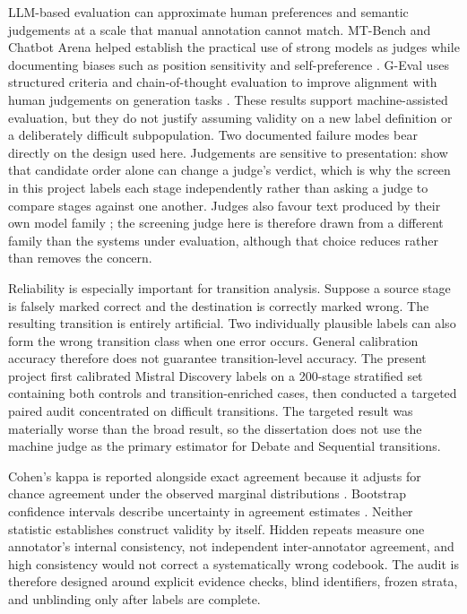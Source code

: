 LLM-based evaluation can approximate human preferences and semantic judgements at a scale that manual annotation cannot match. MT-Bench and Chatbot Arena helped establish the practical use of strong models as judges while documenting biases such as position sensitivity and self-preference \citep{zheng2023judge}. G-Eval uses structured criteria and chain-of-thought evaluation to improve alignment with human judgements on generation tasks \citep{liu2023geval}. These results support machine-assisted evaluation, but they do not justify assuming validity on a new label definition or a deliberately difficult subpopulation. Two documented failure modes bear directly on the design used here. Judgements are sensitive to presentation: \citet{wang2024fair} show that candidate order alone can change a judge's verdict, which is why the screen in this project labels each stage independently rather than asking a judge to compare stages against one another. Judges also favour text produced by their own model family \citep{panickssery2024selfpref}; the screening judge here is therefore drawn from a different family than the systems under evaluation, although that choice reduces rather than removes the concern.

Reliability is especially important for transition analysis. Suppose a source stage is falsely marked correct and the destination is correctly marked wrong. The resulting \ctow{} transition is entirely artificial. Two individually plausible labels can also form the wrong transition class when one error occurs. General calibration accuracy therefore does not guarantee transition-level accuracy. The present project first calibrated Mistral Discovery labels on a 200-stage stratified set containing both controls and transition-enriched cases, then conducted a targeted paired audit concentrated on difficult transitions. The targeted result was materially worse than the broad result, so the dissertation does not use the machine judge as the primary estimator for Debate and Sequential transitions.

Cohen's kappa is reported alongside exact agreement because it adjusts for chance agreement under the observed marginal distributions \citep{cohen1960coefficient}. Bootstrap confidence intervals describe uncertainty in agreement estimates \citep{efron1994bootstrap}. Neither statistic establishes construct validity by itself. Hidden repeats measure one annotator's internal consistency, not independent inter-annotator agreement, and high consistency would not correct a systematically wrong codebook. The audit is therefore designed around explicit evidence checks, blind identifiers, frozen strata, and unblinding only after labels are complete.

